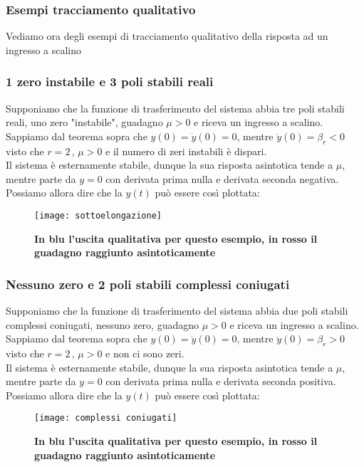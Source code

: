 \documentclass[a4paper]{article}
\begin{document}
	
	\subsubsection{Esempi tracciamento qualitativo}
	Vediamo ora degli esempi di tracciamento qualitativo della risposta ad un ingresso a scalino
	\subsubsection*{1 zero instabile e 3 poli stabili reali}
	Supponiamo che la funzione di trasferimento del sistema abbia tre poli stabili reali, uno zero "instabile", guadagno $\mu>0$ e riceva un ingresso a scalino.\\Sappiamo dal teorema sopra che $y(0)=\dot{y}(0)=0$, mentre $\ddot{y}(0)=\beta_r<0$ visto che $r=2\,,\,\mu>0$ e il numero di zeri instabili è dispari.
	\\Il sistema è esternamente stabile, dunque la sua risposta asintotica tende a $\mu$, mentre parte da $y=0$ con derivata prima nulla e derivata seconda negativa. Possiamo allora dire che la $y(t)$ può essere così plottata:
	\begin{figure}[H]
		\centering
		\texttt{[image: sottoelongazione]}
		\caption{\textbf{In blu l'uscita qualitativa per questo esempio, in rosso il guadagno raggiunto asintoticamente}}\label{minimo}
	\end{figure}

	\subsubsection*{Nessuno zero e 2 poli stabili complessi coniugati}
	Supponiamo che la funzione di trasferimento del sistema abbia due poli stabili complessi coniugati, nessuno zero, guadagno $\mu>0$ e riceva un ingresso a scalino.\\Sappiamo dal teorema sopra che $y(0)=\dot{y}(0)=0$, mentre $\ddot{y}(0)=\beta_r>0$ visto che $r=2\,,\,\mu>0$ e non ci sono zeri.
	\\Il sistema è esternamente stabile, dunque la sua risposta asintotica tende a $\mu$, mentre parte da $y=0$ con derivata prima nulla e derivata seconda positiva. Possiamo allora dire che la $y(t)$ può essere così plottata:
	\begin{figure}[H]
		\centering
		\texttt{[image: complessi coniugati]}
		\caption{\textbf{In blu l'uscita qualitativa per questo esempio, in rosso il guadagno raggiunto asintoticamente}}
	\end{figure}
\end{document}
